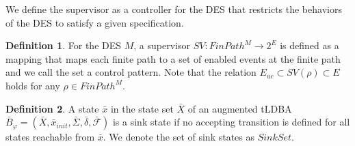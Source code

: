 \documentclass[10 pt, dvipdfmx]{article}
\theoremstyle{definition}
\newtheorem{definition}{Definition}[section]
\begin{document}
We define the supervisor as a controller for the DES that restricts the behaviors of the DES to satisfy a given specification.

\begin{definition}
For the DES $M$,  a supervisor $SV : FinPath^{M} \rightarrow 2^E$ is defined as a mapping that maps each finite path to a set of enabled events at the finite path and we call the set a control pattern. Note that the relation $E_{uc} \subset SV(\rho) \subset E$ holds for any $\rho \in FinPath^M$.
\end{definition}


\begin{definition}
  A state $\bar{x}$ in the state set $\bar{X}$ of an augmented tLDBA $\bar{B}_{\varphi} = (\bar{X}, \bar{x}_{init},\bar{\Sigma},\bar{\delta},\bar{\mathcal{F}})$ is a sink state if no accepting transition is defined for all states reachable from $\bar{x}$. We denote the set of sink states as $Sink Set$.
\end{definition}
\end{document}
